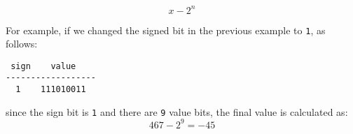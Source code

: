 \begin{equation}
  x - 2^n
\end{equation}

For example, if we changed the signed bit in the previous example to \texttt{1}, as follows:

\begin{verbatim}
 sign    value
------------------
  1    111010011
\end{verbatim}

since the sign bit is \texttt{1} and there are \texttt{9} value bits, the final value is calculated as:
\begin{equation}
  467 - 2^9 = -45
\end{equation}
